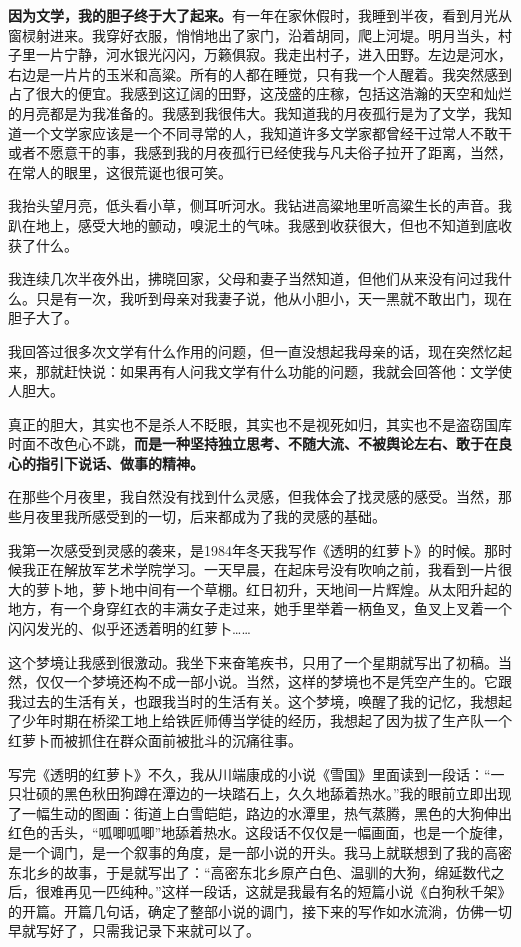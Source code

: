\documentclass[fontset=fandol,12pt,a5paper]{ctexbook}
\begin{document}
\textbf{因为文学，我的胆子终于大了起来。}有一年在家休假时，我睡到半夜，看到月光从窗棂射进来。我穿好衣服，悄悄地出了家门，沿着胡同，爬上河堤。明月当头，村子里一片宁静，河水银光闪闪，万籁俱寂。我走出村子，进入田野。左边是河水，右边是一片片的玉米和高粱。所有的人都在睡觉，只有我一个人醒着。我突然感到占了很大的便宜。我感到这辽阔的田野，这茂盛的庄稼，包括这浩瀚的天空和灿烂的月亮都是为我准备的。我感到我很伟大。我知道我的月夜孤行是为了文学，我知道一个文学家应该是一个不同寻常的人，我知道许多文学家都曾经干过常人不敢干或者不愿意干的事，我感到我的月夜孤行已经使我与凡夫俗子拉开了距离，当然，在常人的眼里，这很荒诞也很可笑。

我抬头望月亮，低头看小草，侧耳听河水。我钻进高粱地里听高粱生长的声音。我趴在地上，感受大地的颤动，嗅泥土的气味。我感到收获很大，但也不知道到底收获了什么。

我连续几次半夜外出，拂晓回家，父母和妻子当然知道，但他们从来没有问过我什么。只是有一次，我听到母亲对我妻子说，他从小胆小，天一黑就不敢出门，现在胆子大了。

我回答过很多次文学有什么作用的问题，但一直没想起我母亲的话，现在突然忆起来，那就赶快说：如果再有人问我文学有什么功能的问题，我就会回答他：文学使人胆大。

真正的胆大，其实也不是杀人不眨眼，其实也不是视死如归，其实也不是盗窃国库时面不改色心不跳，\textbf{而是一种坚持独立思考、不随大流、不被舆论左右、敢于在良心的指引下说话、做事的精神。}

在那些个月夜里，我自然没有找到什么灵感，但我体会了找灵感的感受。当然，那些月夜里我所感受到的一切，后来都成为了我的灵感的基础。

我第一次感受到灵感的袭来，是1984年冬天我写作《透明的红萝卜》的时候。那时候我正在解放军艺术学院学习。一天早晨，在起床号没有吹响之前，我看到一片很大的萝卜地，萝卜地中间有一个草棚。红日初升，天地间一片辉煌。从太阳升起的地方，有一个身穿红衣的丰满女子走过来，她手里举着一柄鱼叉，鱼叉上叉着一个闪闪发光的、似乎还透着明的红萝卜……

这个梦境让我感到很激动。我坐下来奋笔疾书，只用了一个星期就写出了初稿。当然，仅仅一个梦境还构不成一部小说。当然，这样的梦境也不是凭空产生的。它跟我过去的生活有关，也跟我当时的生活有关。这个梦境，唤醒了我的记忆，我想起了少年时期在桥梁工地上给铁匠师傅当学徒的经历，我想起了因为拔了生产队一个红萝卜而被抓住在群众面前被批斗的沉痛往事。

写完《透明的红萝卜》不久，我从川端康成的小说《雪国》里面读到一段话：“一只壮硕的黑色秋田狗蹲在潭边的一块踏石上，久久地舔着热水。”我的眼前立即出现了一幅生动的图画：街道上白雪皑皑，路边的水潭里，热气蒸腾，黑色的大狗伸出红色的舌头，“呱唧呱唧”地舔着热水。这段话不仅仅是一幅画面，也是一个旋律，是一个调门，是一个叙事的角度，是一部小说的开头。我马上就联想到了我的高密东北乡的故事，于是就写出了：“高密东北乡原产白色、温驯的大狗，绵延数代之后，很难再见一匹纯种。”这样一段话，这就是我最有名的短篇小说《白狗秋千架》的开篇。开篇几句话，确定了整部小说的调门，接下来的写作如水流淌，仿佛一切早就写好了，只需我记录下来就可以了。
\end{document}
